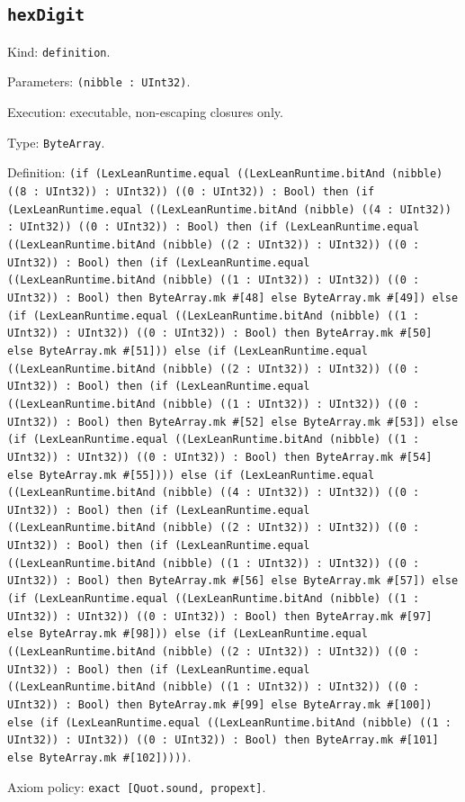 \documentclass[11pt]{article}
\begin{document}
\subsection*{\texttt{hexDigit}}
\noindent Kind: \texttt{definition}.\par
\noindent Parameters: \texttt{(nibble : UInt32)}.\par
\noindent Execution: executable, non-escaping closures only.\par
\noindent Type: \texttt{ByteArray}.\par
\noindent Definition: \texttt{(if (LexLeanRuntime.equal ((LexLeanRuntime.bitAnd (nibble) ((8 : UInt32)) : UInt32)) ((0 : UInt32)) : Bool) then (if (LexLeanRuntime.equal ((LexLeanRuntime.bitAnd (nibble) ((4 : UInt32)) : UInt32)) ((0 : UInt32)) : Bool) then (if (LexLeanRuntime.equal ((LexLeanRuntime.bitAnd (nibble) ((2 : UInt32)) : UInt32)) ((0 : UInt32)) : Bool) then (if (LexLeanRuntime.equal ((LexLeanRuntime.bitAnd (nibble) ((1 : UInt32)) : UInt32)) ((0 : UInt32)) : Bool) then ByteArray.mk \#[48] else ByteArray.mk \#[49]) else (if (LexLeanRuntime.equal ((LexLeanRuntime.bitAnd (nibble) ((1 : UInt32)) : UInt32)) ((0 : UInt32)) : Bool) then ByteArray.mk \#[50] else ByteArray.mk \#[51])) else (if (LexLeanRuntime.equal ((LexLeanRuntime.bitAnd (nibble) ((2 : UInt32)) : UInt32)) ((0 : UInt32)) : Bool) then (if (LexLeanRuntime.equal ((LexLeanRuntime.bitAnd (nibble) ((1 : UInt32)) : UInt32)) ((0 : UInt32)) : Bool) then ByteArray.mk \#[52] else ByteArray.mk \#[53]) else (if (LexLeanRuntime.equal ((LexLeanRuntime.bitAnd (nibble) ((1 : UInt32)) : UInt32)) ((0 : UInt32)) : Bool) then ByteArray.mk \#[54] else ByteArray.mk \#[55]))) else (if (LexLeanRuntime.equal ((LexLeanRuntime.bitAnd (nibble) ((4 : UInt32)) : UInt32)) ((0 : UInt32)) : Bool) then (if (LexLeanRuntime.equal ((LexLeanRuntime.bitAnd (nibble) ((2 : UInt32)) : UInt32)) ((0 : UInt32)) : Bool) then (if (LexLeanRuntime.equal ((LexLeanRuntime.bitAnd (nibble) ((1 : UInt32)) : UInt32)) ((0 : UInt32)) : Bool) then ByteArray.mk \#[56] else ByteArray.mk \#[57]) else (if (LexLeanRuntime.equal ((LexLeanRuntime.bitAnd (nibble) ((1 : UInt32)) : UInt32)) ((0 : UInt32)) : Bool) then ByteArray.mk \#[97] else ByteArray.mk \#[98])) else (if (LexLeanRuntime.equal ((LexLeanRuntime.bitAnd (nibble) ((2 : UInt32)) : UInt32)) ((0 : UInt32)) : Bool) then (if (LexLeanRuntime.equal ((LexLeanRuntime.bitAnd (nibble) ((1 : UInt32)) : UInt32)) ((0 : UInt32)) : Bool) then ByteArray.mk \#[99] else ByteArray.mk \#[100]) else (if (LexLeanRuntime.equal ((LexLeanRuntime.bitAnd (nibble) ((1 : UInt32)) : UInt32)) ((0 : UInt32)) : Bool) then ByteArray.mk \#[101] else ByteArray.mk \#[102]))))}.\par
\noindent Axiom policy: \texttt{exact [Quot.sound, propext]}.\par
\end{document}
